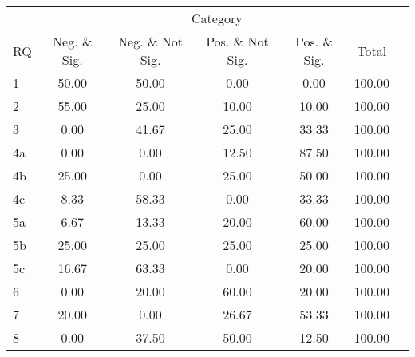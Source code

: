 \begin{tabular}{lcccccc}
\hline
\hline
 & \multicolumn{5}{c}{Category} \\
RQ&Neg. \& Sig.&Neg. \& Not Sig.&Pos. \& Not Sig.&Pos. \& Sig.&Total \\
%
\hline
1&50.00&50.00&0.00&0.00&100.00 \\
2&55.00&25.00&10.00&10.00&100.00 \\
3&0.00&41.67&25.00&33.33&100.00 \\
4a&0.00&0.00&12.50&87.50&100.00 \\
4b&25.00&0.00&25.00&50.00&100.00 \\
4c&8.33&58.33&0.00&33.33&100.00 \\
5a&6.67&13.33&20.00&60.00&100.00 \\
5b&25.00&25.00&25.00&25.00&100.00 \\
5c&16.67&63.33&0.00&20.00&100.00 \\
6&0.00&20.00&60.00&20.00&100.00 \\
7&20.00&0.00&26.67&53.33&100.00 \\
8&0.00&37.50&50.00&12.50&100.00 \\
\hline
\hline
\end{tabular}
